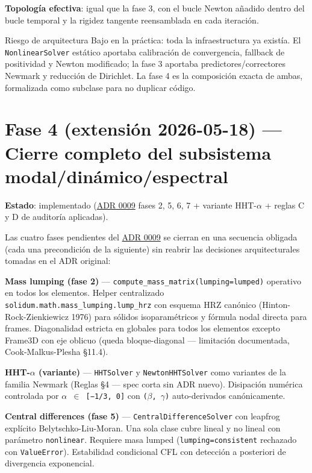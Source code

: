 \documentclass[11pt,oneside]{report}
\begin{document}
\textbf{Topología efectiva}: igual que la fase 3, con el bucle Newton añadido dentro del bucle temporal y la rigidez tangente reensamblada en cada iteración.

\begin{infobox}{Riesgo de arquitectura}
Bajo en la práctica: toda la infraestructura ya existía. El \texttt{NonlinearSolver} estático aportaba calibración de convergencia, fallback de positividad y Newton modificado; la fase 3 aportaba predictores/correctores Newmark y reducción de Dirichlet. La fase 4 es la composición exacta de ambas, formalizada como subclase para no duplicar código.
\end{infobox}

\section{Fase 4 (extensión 2026-05-18) --- Cierre completo del subsistema modal/dinámico/espectral}

\textbf{Estado}: implementado (\hyperref[adr:0009]{ADR 0009} fases 2, 5, 6, 7 + variante HHT-\ensuremath{\alpha} + reglas C y D de auditoría aplicadas).

Las cuatro fases pendientes del \hyperref[adr:0009]{ADR 0009} se cierran en una secuencia obligada (cada una precondición de la siguiente) sin reabrir las decisiones arquitecturales tomadas en el ADR original:

\textbf{Mass lumping (fase 2)} --- \texttt{compute\_\allowbreak{}mass\_\allowbreak{}matrix(lumping=\textquotedbl{}lumped\textquotedbl{})} operativo en todos los elementos. Helper centralizado \texttt{solidum.\allowbreak{}math.\allowbreak{}mass\_\allowbreak{}lumping.\allowbreak{}lump\_\allowbreak{}hrz} con esquema HRZ canónico (Hinton-Rock-Zienkiewicz 1976) para sólidos isoparamétricos y fórmula nodal directa para frames. Diagonalidad estricta en globales para todos los elementos excepto Frame3D con eje oblicuo (queda bloque-diagonal --- limitación documentada, Cook-Malkus-Plesha §11.4).

\textbf{HHT-\ensuremath{\alpha} (variante)} --- \texttt{HHTSolver} y \texttt{NewtonHHTSolver} como variantes de la familia Newmark (Reglas §4 --- spec corta sin ADR nuevo). Disipación numérica controlada por \texttt{\ensuremath{\alpha} \ensuremath{\in} [−1/3, 0]} con \texttt{(\ensuremath{\beta}, \ensuremath{\gamma})} auto-derivados canónicamente.

\textbf{Central differences (fase 5)} --- \texttt{CentralDifferenceSolver} con leapfrog explícito Belytschko-Liu-Moran. Una sola clase cubre lineal y no lineal con parámetro \texttt{nonlinear}. Requiere masa lumped (\texttt{lumping=\textquotedbl{}consistent\textquotedbl{}} rechazado con \texttt{ValueError}). Estabilidad condicional CFL con detección a posteriori de divergencia exponencial.
\end{document}
